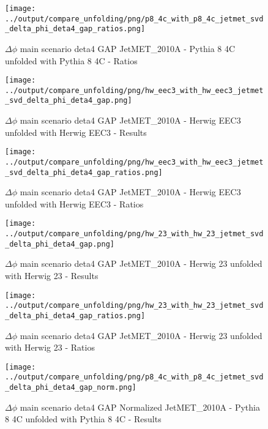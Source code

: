 \documentclass[11pt]{book}
\begin{document}
\begin{figure}[ht]
\centering
\texttt{[image: ../output/compare\_unfolding/png/p8\_4c\_with\_p8\_4c\_jetmet\_svd\_delta\_phi\_deta4\_gap\_ratios.png]}
\caption{$\Delta\phi$ main scenario deta4 GAP JetMET\_2010A - Pythia 8 4C unfolded with Pythia 8 4C - Ratios}
\label{p8_p8_jetmet_svd_delta_phi_deta4_gap_b}
\end{figure}

\begin{figure}[ht]
\centering
\texttt{[image: ../output/compare\_unfolding/png/hw\_eec3\_with\_hw\_eec3\_jetmet\_svd\_delta\_phi\_deta4\_gap.png]}
\caption{$\Delta\phi$ main scenario deta4 GAP JetMET\_2010A - Herwig EEC3 unfolded with Herwig EEC3 - Results}
\label{hw_eec3_hw_eec3_jetmet_svd_delta_phi_deta4_gap_a}
\end{figure}

\begin{figure}[ht]
\centering
\texttt{[image: ../output/compare\_unfolding/png/hw\_eec3\_with\_hw\_eec3\_jetmet\_svd\_delta\_phi\_deta4\_gap\_ratios.png]}
\caption{$\Delta\phi$ main scenario deta4 GAP JetMET\_2010A - Herwig EEC3 unfolded with Herwig EEC3 - Ratios}
\label{hw_eec3_hw_eec3_jetmet_svd_delta_phi_deta4_gap_b}
\end{figure}

\begin{figure}[ht]
\centering
\texttt{[image: ../output/compare\_unfolding/png/hw\_23\_with\_hw\_23\_jetmet\_svd\_delta\_phi\_deta4\_gap.png]}
\caption{$\Delta\phi$ main scenario deta4 GAP JetMET\_2010A - Herwig 23 unfolded with Herwig 23 - Results}
\label{hw_23_hw_23_jetmet_svd_delta_phi_deta4_gap_a}
\end{figure}

\begin{figure}[ht]
\centering
\texttt{[image: ../output/compare\_unfolding/png/hw\_23\_with\_hw\_23\_jetmet\_svd\_delta\_phi\_deta4\_gap\_ratios.png]}
\caption{$\Delta\phi$ main scenario deta4 GAP JetMET\_2010A - Herwig 23 unfolded with Herwig 23 - Ratios}
\label{hw_23_hw_23_jetmet_svd_delta_phi_deta4_gap_b}
\end{figure}

\begin{figure}[ht]
\centering
\texttt{[image: ../output/compare\_unfolding/png/p8\_4c\_with\_p8\_4c\_jetmet\_svd\_delta\_phi\_deta4\_gap\_norm.png]}
\caption{$\Delta\phi$ main scenario deta4 GAP Normalized JetMET\_2010A - Pythia 8 4C unfolded with Pythia 8 4C - Results}
\label{p8_p8_jetmet_svd_delta_phi_deta4_gap_norm_a}
\end{figure}
\end{document}
